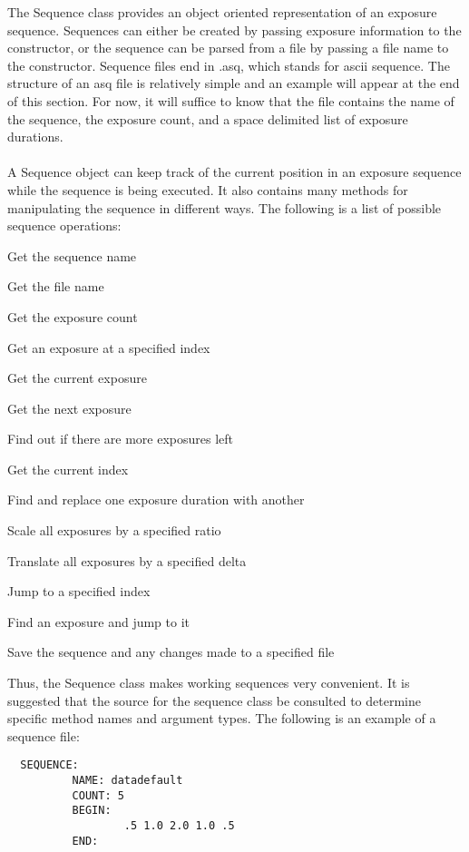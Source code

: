 The Sequence class provides an object oriented representation of an exposure
sequence. Sequences can either be created by passing exposure information to
the constructor, or the sequence can be parsed from a file by passing a file
name to the constructor. Sequence files end in .asq, which stands for ascii
sequence. The structure of an asq file is relatively simple and an example
will appear at the end of this section. For now, it will suffice to know that
the file contains the name of the sequence, the exposure count, and a space delimited
list of exposure durations.\\
\\
A Sequence object can keep track of the current position in an exposure sequence
while the sequence is being executed. It also contains many methods for manipulating
the sequence in different ways. The following is a list of possible sequence operations:
\begin{list}{}{}
\item Get the sequence name
\item Get the file name
\item Get the exposure count
\item Get an exposure at a specified index
\item Get the current exposure
\item Get the next exposure
\item Find out if there are more exposures left
\item Get the current index
\item Find and replace one exposure duration with another
\item Scale all exposures by a specified ratio
\item Translate all exposures by a specified delta
\item Jump to a specified index
\item Find an exposure and jump to it
\item Save the sequence and any changes made to a specified file
\end{list}
Thus, the Sequence class makes working sequences very convenient. It is suggested
that the source for the sequence class be consulted to determine specific method
names and argument types. The following is an example of a sequence file:
\begin{verbatim}
  SEQUENCE:
          NAME: datadefault
          COUNT: 5
          BEGIN:
                  .5 1.0 2.0 1.0 .5
          END:
\end{verbatim}
